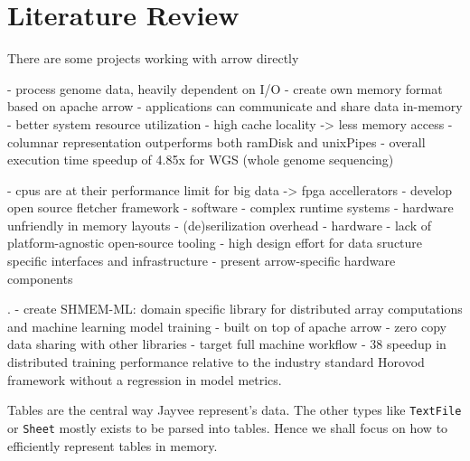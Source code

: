 \chapter{Literature Review}
\label{chapter:Literature}

There are some projects working with arrow directly

\autocite{Ahmad2020}
- process genome data, heavily dependent on I/O
- create own memory format based on apache arrow
- applications can communicate and share data in-memory
- better system resource utilization
- high cache locality -> less memory access
- columnar representation outperforms both ramDisk and unixPipes
- overall execution time speedup of 4.85x for WGS (whole genome sequencing)

\autocite{Peltenburg2021}
- cpus are at their performance limit for big data -> fpga accellerators
- develop open source fletcher framework
- software
- complex runtime systems
- hardware unfriendly in memory layouts
- (de)serilization overhead
- hardware
- lack of platform-agnostic open-source tooling
- high design effort for data sructure specific interfaces and infrastructure
- present arrow-specific hardware components


\autocite{Grossman2022}.
- create SHMEM-ML: domain specific library for distributed array computations and machine learning model training
- built on top of apache arrow
- zero copy data sharing with other libraries
- target full machine workflow
-  38 speedup in distributed training performance relative to the industry standard Horovod framework without a regression in model metrics.

Tables are the central way Jayvee represent's data.
The other types like \Verb|TextFile| or \Verb|Sheet| mostly exists to be parsed into tables.
Hence %
we shall focus on how to efficiently represent tables in memory.

